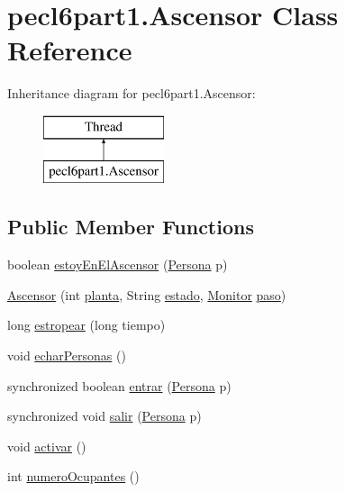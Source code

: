 \hypertarget{classpecl6part1_1_1_ascensor}{}\section{pecl6part1.\+Ascensor Class Reference}
\label{classpecl6part1_1_1_ascensor}
Inheritance diagram for pecl6part1.\+Ascensor\+:\begin{figure}[H]
\begin{center}
\leavevmode
\includegraphics[height=2.000000cm]{classpecl6part1_1_1_ascensor}
\end{center}
\end{figure}
\subsection*{Public Member Functions}
\begin{DoxyCompactItemize}
\item 
boolean \mbox{\hyperlink{classpecl6part1_1_1_ascensor_af9df13b79ebb74d8db4277d32c7c2bf5}{estoy\+En\+El\+Ascensor}} (\mbox{\hyperlink{classpecl6part1_1_1_persona}{Persona}} p)
\item 
\mbox{\hyperlink{classpecl6part1_1_1_ascensor_ac18cbef896a8d2d61e6194e13e37b987}{Ascensor}} (int \mbox{\hyperlink{classpecl6part1_1_1_ascensor_a580b836287ba07c6658c03a5e35fbbdb}{planta}}, String \mbox{\hyperlink{classpecl6part1_1_1_ascensor_ad892045a12a5bfbd5b352fede74a1d0f}{estado}}, \mbox{\hyperlink{classpecl6part1_1_1_monitor}{Monitor}} \mbox{\hyperlink{classpecl6part1_1_1_ascensor_ae7416511a25816c86095a3f91915af06}{paso}})
\item 
long \mbox{\hyperlink{classpecl6part1_1_1_ascensor_aff7ce91902c28ffca4ef4bff6622bb24}{estropear}} (long tiempo)
\item 
void \mbox{\hyperlink{classpecl6part1_1_1_ascensor_acb83d6d5b2a100ea201f54e332476cda}{echar\+Personas}} ()
\item 
synchronized boolean \mbox{\hyperlink{classpecl6part1_1_1_ascensor_a6a9eff62048897df3cd1a4c1ffd3d979}{entrar}} (\mbox{\hyperlink{classpecl6part1_1_1_persona}{Persona}} p)
\item 
synchronized void \mbox{\hyperlink{classpecl6part1_1_1_ascensor_a1a2339117b608f4b270c60e12e0bea57}{salir}} (\mbox{\hyperlink{classpecl6part1_1_1_persona}{Persona}} p)
\item 
void \mbox{\hyperlink{classpecl6part1_1_1_ascensor_ae9ae214924705efc2467f8318d8127d9}{activar}} ()
\item 
int \mbox{\hyperlink{classpecl6part1_1_1_ascensor_a20b3535c570b0277099d3744c474f44e}{numero\+Ocupantes}} ()
\end{DoxyCompactItemize}
